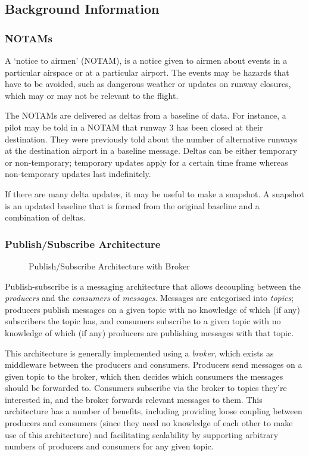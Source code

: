 \documentclass[a4paper, 12pt]{article}
\begin{document}
\subsection{Background Information}

\subsubsection{NOTAMs}
A `notice to airmen' (NOTAM), is a notice given to airmen about events in a particular airspace or at a particular airport. The events may be hazards that have to be avoided, such as dangerous weather or updates on runway closures, which may or may not be relevant to the flight.

The NOTAMs are delivered as deltas from a baseline of data. For instance, a pilot may be told in a NOTAM that runway 3 has been closed at their destination. They were previously told about the number of alternative runways at the destination airport in a baseline message. Deltas can be either temporary or non-temporary; temporary updates apply for a certain time frame whereas non-temporary updates last indefinitely.

If there are many delta updates, it may be useful to make a snapshot. A snapshot is an updated baseline that is formed from the original baseline and a combination of deltas.

\newpage

\subsubsection{Publish/Subscribe Architecture}

\begin{figure}
\begin{center}
\def\svgwidth{\columnwidth}

\end{center}
\caption{Publish/Subscribe Architecture with Broker}
\label{fig:example_net}
\end{figure}

Publish-subscribe is a messaging architecture that allows decoupling between the \emph{producers} and the \emph{consumers} of \emph{messages}. Messages are categorised into \emph{topics}; producers publish messages on a given topic with no knowledge of which (if any) subscribers the topic has, and consumers subscribe to a given topic with no knowledge of which (if any) producers are publishing messages with that topic.

This architecture is generally implemented using a \emph{broker}, which exists as middleware between the producers and consumers. Producers send messages on a given topic to the broker, which then decides which consumers the messages should be forwarded to. Consumers subscribe via the broker to topics they’re interested in, and the broker forwards relevant messages to them. This architecture has a number of benefits, including providing loose coupling between producers and consumers (since they need no knowledge of each other to make use of this architecture) and facilitating scalability by supporting arbitrary numbers of producers and consumers for any given topic.
\end{document}
